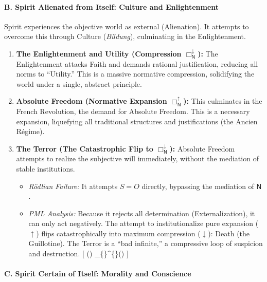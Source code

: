 \paragraph{B. Spirit Alienated from Itself: Culture and Enlightenment}\label{b.-spirit-alienated-from-itself-culture-and-enlightenment}

Spirit experiences the objective world as external (Alienation). It attempts to overcome this through Culture (\emph{Bildung}), culminating in the Enlightenment.

\begin{enumerate}
\def\labelenumi{\arabic{enumi}.}
\tightlist
\item
  \textbf{The Enlightenment and Utility (Compression \(\Box_{\mathsf{N}}^{\downarrow}\)):} The Enlightenment attacks Faith and demands rational justification, reducing all norms to ``Utility.'' This is a massive normative compression, solidifying the world under a single, abstract principle.
\item
  \textbf{Absolute Freedom (Normative Expansion \(\Box_{\mathsf{N}}^{\uparrow}\)):} This culminates in the French Revolution, the demand for Absolute Freedom. This is a necessary expansion, liquefying all traditional structures and justifications (the Ancien Régime).
\item
  \textbf{The Terror (The Catastrophic Flip to \(\Box_{\mathsf{N}}^{\downarrow}\)):} Absolute Freedom attempts to realize the subjective will immediately, without the mediation of stable institutions.

  \begin{itemize}
  \tightlist
  \item
    \emph{Rödlian Failure:} It attempts \(S=O\) directly, bypassing the mediation of \(\mathsf{N}\).
  \item
    \emph{PML Analysis:} Because it rejects all determination (Externalization), it can only act negatively. The attempt to institutionalize pure expansion (\(\uparrow\)) flips catastrophically into maximum compression (\(\downarrow\)): Death (the Guillotine). The Terror is a ``bad infinite,'' a compressive loop of suspicion and destruction. {[} () \implies \Box\_\{\}\^{}\{\downarrow\}() {]}
  \end{itemize}
\end{enumerate}

\paragraph{C. Spirit Certain of Itself: Morality and Conscience}\label{c.-spirit-certain-of-itself-morality-and-conscience}

